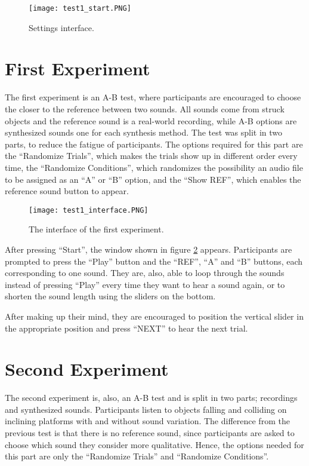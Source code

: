 \begin{figure}[H]
  \centering
    \texttt{[image: test1\_start.PNG]}
        \caption{Settings interface.}
        \label{fig:exp_start}
\end{figure}

\section*{First Experiment}
The first experiment is an A-B test, where participants are encouraged to choose the closer to the reference between two sounds. All sounds come from struck objects and the reference sound is a real-world recording, while A-B options are synthesized sounds one for each synthesis method. The test was split in two parts, to reduce the fatigue of participants. The options required for this part are the ``Randomize Trials'', which makes the trials show up in different order every time, the ``Randomize Conditions'', which randomizes the possibility an audio file to be assigned as an ``A'' or ``B'' option, and the ``Show REF'', which enables the reference sound button to appear. 

\begin{figure}[H]
    \centering  
     \texttt{[image: test1\_interface.PNG]}
        \caption{The interface of the first experiment.}
        \label{fig:t1_ui}
\end{figure}

After pressing ``Start'', the window shown in figure \ref{fig:t1_ui} appears. Participants are prompted to press the ``Play'' button and the ``REF'', ``A'' and ``B'' buttons, each corresponding to one sound. They are, also, able to loop through the sounds instead of pressing ``Play'' every time they want to hear a sound again, or to shorten the sound length using the sliders on the bottom. 

After making up their mind, they are encouraged to position the vertical slider in the appropriate position and press ``NEXT'' to hear the next trial.

\section*{Second Experiment}
The second experiment is, also, an A-B test and is split in two parts; recordings and synthesized sounds. Participants listen to objects falling and colliding on inclining platforms with and without sound variation. The difference from the previous test is that there is no reference sound, since participants are asked to choose which sound they consider more qualitative. Hence, the options needed for this part are only the ``Randomize Trials'' and ``Randomize Conditions''.

